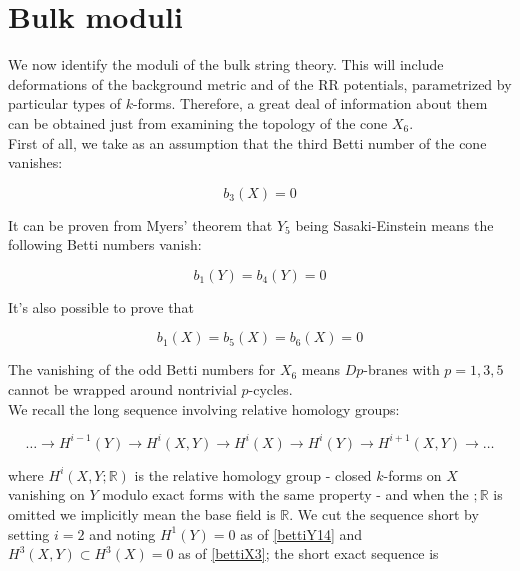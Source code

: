 

\section{Bulk moduli}


We now identify the moduli of the bulk string theory. This will include deformations of the background metric and of the RR potentials, parametrized by particular types of $k$-forms. Therefore, a great deal of information about them can be obtained just from examining the topology of the cone $X_6$.\\

First of all, we take as an assumption that the third Betti number of the cone vanishes:

\begin{equation}
	b_3(X) = 0 \label{bettiX3}
\end{equation}

It can be proven from Myers' theorem that $Y_5$ being Sasaki-Einstein means the following Betti numbers vanish:

\begin{equation}
	b_1(Y) = b_4(Y) = 0 \label{bettiY14}
\end{equation}

It's also possible to prove that

\begin{equation}
	b_1(X) = b_5(X) = b_6(X) = 0
\end{equation}

The vanishing of the odd Betti numbers for $X_6$ means $Dp$-branes with $p = 1,3,5$ cannot be wrapped around nontrivial $p$-cycles.\\

We recall the long sequence involving relative homology groups:

\begin{equation}
	\ldots \rightarrow H^{i-1}(Y) \rightarrow H^{i}(X,Y) \rightarrow H^i(X) \rightarrow H^i(Y) \rightarrow H^{i+1}(X,Y) \rightarrow \ldots
\end{equation}

where $H^i(X,Y;\mathbb{R})$ is the relative homology group - closed $k$-forms on $X$ vanishing on $Y$ modulo exact forms with the same property - and when the $;\mathbb{R}$ is omitted we implicitly mean the base field is $\mathbb{R}$. We cut the sequence short by setting $i=2$ and noting $H^1(Y) = 0$ as of \ref{bettiY14} and $H^3(X,Y) \subset H^3(X) = 0$ as of \ref{bettiX3}; the short exact sequence is

